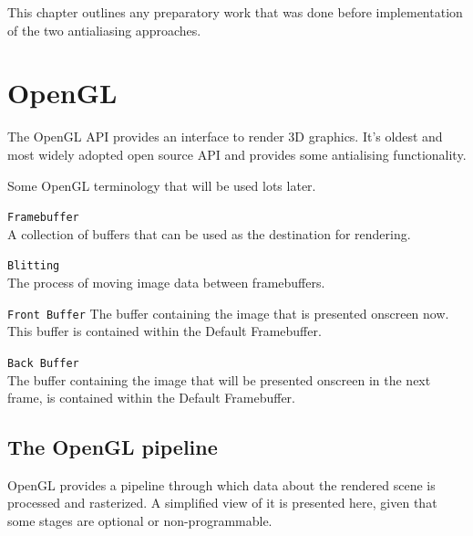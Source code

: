 \documentclass[12pt,a4paper,twoside,openright]{report}
\begin{document}
This chapter outlines any preparatory work that was done before implementation of the two antialiasing approaches.

\section{OpenGL}

The OpenGL API provides an interface to render 3D graphics. It's oldest and most widely adopted open source API and provides some antialising functionality.

Some OpenGL terminology that will be used lots later.


\begin{description}

\item\texttt{Framebuffer} \\
  A collection of buffers that can be used as the destination for rendering.

\item\texttt{Blitting} \\
  The process of moving image data between framebuffers.

\item\texttt{Front Buffer}
  The buffer containing the image that is presented onscreen now. This buffer is contained within the Default Framebuffer.

\item\texttt{Back Buffer} \\
  The buffer containing the image that will be presented onscreen in the next frame, is contained within the Default Framebuffer. 
\end{description}

\subsection{The OpenGL pipeline}

OpenGL provides a pipeline through which data about the rendered scene is processed and rasterized. A simplified view of it is presented here, given that some stages are optional or non-programmable.
\end{document}
